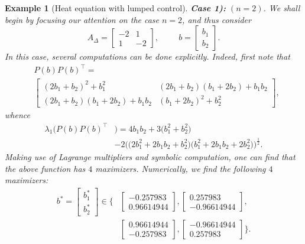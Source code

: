 \documentclass[journal,twoside,web]{ieeecolor}
\newtheorem{example}{Example}
\begin{document}
\begin{example}[Heat equation with lumped control]
	\noindent \textbf{Case 1):}
	$(n=2)$.
	We shall begin by focusing our attention on the case $n=2$, and thus consider 
	\begin{equation*}
	A_{\Delta} = 
	\begin{bmatrix} 
	-2 & 1\\
	1 & -2
	\end{bmatrix}, \hspace{1cm} b = \begin{bmatrix}b_1\\b_2\end{bmatrix}.
	\end{equation*} 
	In this case, several computations can be done explicitly. Indeed, first note that 
	\begin{align*}
	&P(b)P(b)^\top= \\
	&\begin{bmatrix}
	(2b_1+b_2)^2+b_1^2 & (2b_1+b_2)(b_1+2b_2)+b_1b_2 \\
	(2b_1+b_2)(b_1+2b_2)+b_1b_2 & (b_1+2b_2)^2+b_2^2
	\end{bmatrix},
	\end{align*}
	whence 
	\begin{align*}
	\lambda_1\Big(P(b)P(b)^\top&\Big)= 4b_1b_2+3\big(b_1^2+b_2^2\big)\\
	&-2\Big(\big(2b_1^2+2b_1b_2+b_2^2\big)\big(b_1^2+2b_1b_2+2b_2^2\big)\Big)^{\frac{1}{2}}.
	\end{align*}
	Making use of Lagrange multipliers and symbolic computation, one can find that the above function has $4$ maximizers.
	Numerically, we find the following $4$ maximizers: 
	\begin{align} \label{eq: ex1.1.max}
	b^* = \begin{bmatrix} b_1^*\\ b_2^*\end{bmatrix} \in \Bigg\{&\begin{bmatrix} -0.257983\\0.96614944\end{bmatrix}, \begin{bmatrix} 0.257983\\-0.96614944\end{bmatrix},\nonumber  \\
	&\begin{bmatrix} 0.96614944\\-0.257983\end{bmatrix}, \begin{bmatrix} -0.96614944\\0.257983\end{bmatrix} \Bigg\}.

\end{align}
\end{example}
\end{document}
